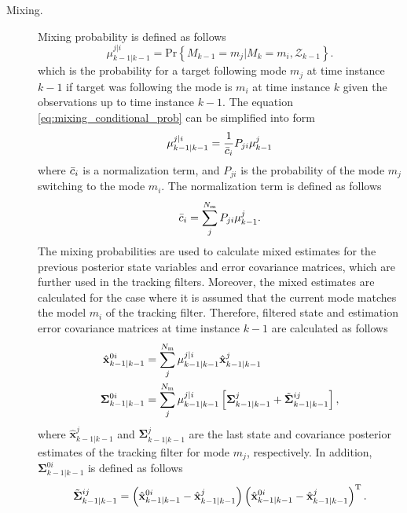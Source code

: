 \documentclass[english, 12pt, a4paper, elec, utf8, a-1b, online]{aaltothesis}
\renewcommand{\vec}[1]{\mathbf{#1}}
\renewcommand{\Pr}[1]{\text{Pr}\left\{ #1 \right\}}
\newcommand{\transpose}[1]{#1^\text{T}}
\newcommand{\lastmxprobs}{\mu^{j|i}_{k-1|k-1}}
\newcommand{\mxnorm}{ \Bar{c}_i }
\newcommand{\xmxinit}{\hat{\vec{x}}^{0i}_{k-1|k-1}}
\newcommand{\ecovmxinit}{\bm{\Sigma}^{0i}_{k-1|k-1}}
\newcommand{\modexlast}{\hat{\vec{x}}^{j}_{k-1|k-1}}
\newcommand{\modecovlast}{\bm{\Sigma}^j_{k-1|k-1}}
\newcommand{\modemxcovlast}{\Tilde{\bm{\Sigma}}^{ij}_{k-1|k-1}}
\newcommand{\nmodels}{{N_\text{m}}}
\begin{document}
\begin{description}
\item[Mixing.]

Mixing probability is defined as follows
\begin{equation}\label{eq:mixing_conditional_prob}
    \lastmxprobs = \Pr{M_{k-1}=m_j|M_{k}=m_i, \mathcal{Z}_{k-1}}.
\end{equation}
which is the probability for a target following mode $m_j$ at time instance $k-1$ if target was following the mode is $m_i$ at time instance $k$ given the observations up to time instance $k-1$.
The equation \eqref{eq:mixing_conditional_prob} can be simplified into form
\begin{equation}
    \lastmxprobs = \frac{1}{\mxnorm} P_{ji} \mu^j_{k-1} \label{eq:imm_mx_probs}
\end{equation}
where $\mxnorm$ is a normalization term, and $P_{ji}$ is the probability of the mode $m_j$ switching to the mode $m_i$. 
The normalization term is defined as follows
\begin{equation}
    \mxnorm = \sum_j^\nmodels P_{ji} \mu^j_{k-1}. \label{eq:imm_mx_normalization}
\end{equation}
The mixing probabilities are used to calculate mixed estimates for the previous posterior state variables and error covariance matrices, which are further used in the tracking filters.
Moreover, the mixed estimates are calculated for the case where it is assumed that the current mode matches the model $m_i$ of the tracking filter.
Therefore, filtered state and estimation error covariance matrices at time instance $k-1$ are calculated as follows
\begin{subequations}
\begin{align}
    \xmxinit &= \sum_j^\nmodels \lastmxprobs \modexlast \label{eq:imm_mx_init_x}\\
    \ecovmxinit &= \sum_j^\nmodels \lastmxprobs \left[ \modecovlast + \modemxcovlast \right], \label{eq:imm_mx_init_P}
\end{align}
\end{subequations}
where $\modexlast$ and $\modecovlast$ are the last state and covariance posterior estimates of the tracking filter for mode $m_j$, respectively. 
In addition, $\ecovmxinit$ is defined as follows
\begin{equation}
    \modemxcovlast = 
    \left( \xmxinit - \modexlast  \right) 
    \transpose{\left( \xmxinit - \modexlast   \right)}.\label{eq:imm_mx_init_Ptilde}
\end{equation}


\end{description}
\end{document}
